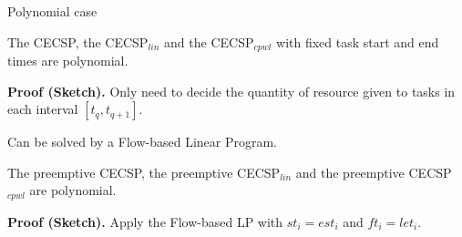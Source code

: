 \begin{frame}{Polynomial case}
  \vfill
  \begin{theorem}
    The CECSP, the CECSP$_{lin}$ and the CECSP$_{cpwl}$ with fixed
    task start and end times are polynomial.  
  \end{theorem}
  \vfill
 {\bf Proof (Sketch). } Only need to decide the quantity of resource
 given to tasks in each interval $[t_{q},t_{q+1}]$.

 Can be solved by a Flow-based Linear Program.
 \vfill
  \begin{theorem}
The preemptive CECSP, the preemptive CECSP$_{lin}$ and the preemptive CECSP$_{cpwl}$ are polynomial.  
  \end{theorem}
  \vfill
  
 {\bf Proof (Sketch). } Apply the Flow-based LP with $st_i=est_i$ and $ft_i=let_i$.
 \vfill
\end{frame}



